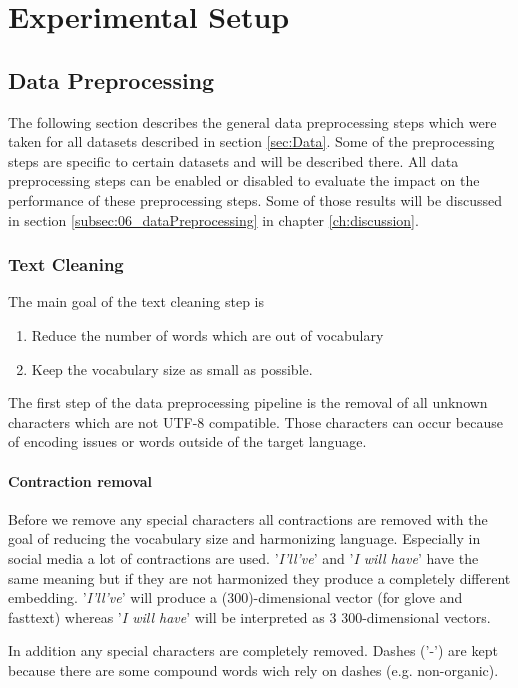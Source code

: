\chapter{Experimental Setup}
\label{ch:setup}

\section{Data Preprocessing}
The following section describes the general data preprocessing steps which were taken for all datasets described in section \ref{sec:Data}. Some of the preprocessing steps are specific to certain datasets and will be described there. All data preprocessing steps can be enabled or disabled to evaluate the impact on the performance of these preprocessing steps. Some of those results will be discussed in section \ref{subsec:06_dataPreprocessing} in chapter \ref{ch:discussion}.

\subsection{Text Cleaning}
The main goal of the text cleaning step is 
\begin{enumerate}
	\item Reduce the number of words which are out of vocabulary
	\item Keep the vocabulary size as small as possible.
\end{enumerate}


The first step of the data preprocessing pipeline is the removal of all unknown characters which are not UTF-8 compatible. Those characters can occur because of encoding issues or words outside of the target language. 
\subsubsection*{Contraction removal}

Before we remove any special characters all contractions are removed with the goal of reducing the vocabulary size and harmonizing language. Especially in social media a lot of contractions are used. '\textit{I'll've}' and '\textit{I will have}' have the same meaning but if they are not harmonized they produce a completely different embedding. '\textit{I'll've}' will produce a (300)-dimensional vector (for glove and fasttext) whereas '\textit{I will have}' will be interpreted as 3 300-dimensional vectors. 



In addition any special characters are completely removed. Dashes ('-') are kept because there are some compound words wich rely on dashes (e.g. non-organic).



